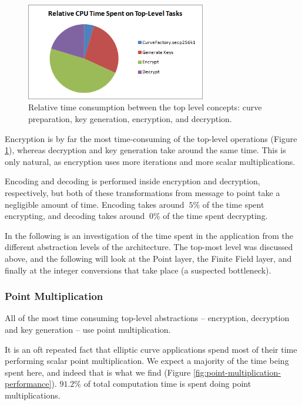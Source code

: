\begin{figure}[htb!]
	\centering
	\includegraphics[width=0.70\textwidth]{performance/top-level--relative-time}
	\caption{Relative time consumption between the top level concepts: curve preparation, key generation, encryption, and decryption.}
	\label{fig:toplevel-performance}
\end{figure}

Encryption is by far the most time-consuming of the top-level operations (Figure \ref{fig:toplevel-performance}), whereas decryption and
key generation take around the same time. This is only natural, as encryption uses more iterations and more scalar multiplications.

Encoding and decoding is performed inside encryption and decryption, respectively, but both of these transformations from message to
point take a negligible amount of time. Encoding takes around \(~5\%\) of the time spent encrypting, and decoding takes around \(~0\%\)
of the time spent decrypting.

In the following is an investigation of the time spent in the application from the different abstraction levels of the architecture.
The top-most level was discussed above, and the following will look at the Point layer, the Finite Field layer, and finally at the
integer conversions that take place (a suspected bottleneck).

\subsubsection{Point Multiplication}
\label{sec:performance_components_multiplication}

All of the most time consuming top-level abstractions -- encryption, decryption and key generation -- use point multiplication.

It is an oft repeated fact that elliptic curve applications spend most of their time performing scalar point multiplication. We expect a
majority of the time being spent here, and indeed that is what we find (Figure \ref{fig:point-multiplication-performance}). \(91.2\%\) of
total computation time is spent doing point multiplications.

